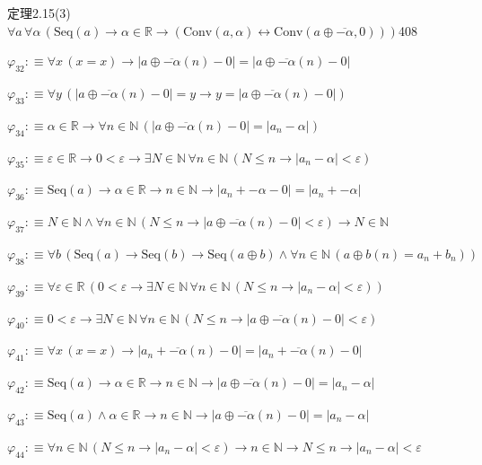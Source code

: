 \begin{fullproof}{定理2.15(3)}{$\forall a\,\forall \alpha\,(\mathrm{Seq}(a) \to \alpha \in \mathbb{R} \to (\mathrm{Conv}(a,\alpha) \leftrightarrow \mathrm{Conv}(a \oplus \overline{-\alpha},0)))$}{408}
\begin{abbrevlist}
\item $\varphi_{32} :\equiv \forall x\,(x = x) \to \lvert a \oplus \overline{-\alpha}(n) - 0 \rvert = \lvert a \oplus \overline{-\alpha}(n) - 0 \rvert$
\item $\varphi_{33} :\equiv \forall y\,(\lvert a \oplus \overline{-\alpha}(n) - 0 \rvert = y \to y = \lvert a \oplus \overline{-\alpha}(n) - 0 \rvert)$
\item $\varphi_{34} :\equiv \alpha \in \mathbb{R} \to \forall n \in \mathbb{N}\,(\lvert a \oplus \overline{-\alpha}(n) - 0 \rvert = \lvert a_{n} - \alpha \rvert)$
\item $\varphi_{35} :\equiv \varepsilon \in \mathbb{R} \to 0 < \varepsilon \to \exists N \in \mathbb{N}\,\forall n \in \mathbb{N}\,(N \leq n \to \lvert a_{n} - \alpha \rvert < \varepsilon)$
\item $\varphi_{36} :\equiv \mathrm{Seq}(a) \to \alpha \in \mathbb{R} \to n \in \mathbb{N} \to \lvert a_{n} + -\alpha - 0 \rvert = \lvert a_{n} + -\alpha \rvert$
\item $\varphi_{37} :\equiv N \in \mathbb{N} \land \forall n \in \mathbb{N}\,(N \leq n \to \lvert a \oplus \overline{-\alpha}(n) - 0 \rvert < \varepsilon) \to N \in \mathbb{N}$
\item $\varphi_{38} :\equiv \forall b\,(\mathrm{Seq}(a) \to \mathrm{Seq}(b) \to \mathrm{Seq}(a \oplus b) \land \forall n \in \mathbb{N}\,(a \oplus b(n) = a_{n} + b_{n}))$
\item $\varphi_{39} :\equiv \forall \varepsilon \in \mathbb{R}\,(0 < \varepsilon \to \exists N \in \mathbb{N}\,\forall n \in \mathbb{N}\,(N \leq n \to \lvert a_{n} - \alpha \rvert < \varepsilon))$
\item $\varphi_{40} :\equiv 0 < \varepsilon \to \exists N \in \mathbb{N}\,\forall n \in \mathbb{N}\,(N \leq n \to \lvert a \oplus \overline{-\alpha}(n) - 0 \rvert < \varepsilon)$
\item $\varphi_{41} :\equiv \forall x\,(x = x) \to \lvert a_{n} + \overline{-\alpha}(n) - 0 \rvert = \lvert a_{n} + \overline{-\alpha}(n) - 0 \rvert$
\item $\varphi_{42} :\equiv \mathrm{Seq}(a) \to \alpha \in \mathbb{R} \to n \in \mathbb{N} \to \lvert a \oplus \overline{-\alpha}(n) - 0 \rvert = \lvert a_{n} - \alpha \rvert$
\item $\varphi_{43} :\equiv \mathrm{Seq}(a) \land \alpha \in \mathbb{R} \to n \in \mathbb{N} \to \lvert a \oplus \overline{-\alpha}(n) - 0 \rvert = \lvert a_{n} - \alpha \rvert$
\item $\varphi_{44} :\equiv \forall n \in \mathbb{N}\,(N \leq n \to \lvert a_{n} - \alpha \rvert < \varepsilon) \to n \in \mathbb{N} \to N \leq n \to \lvert a_{n} - \alpha \rvert < \varepsilon$

\end{abbrevlist}
\end{fullproof}
